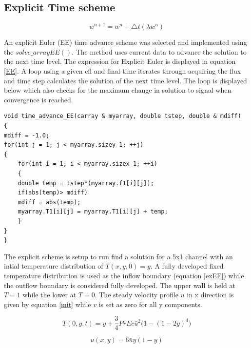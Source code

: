 \documentclass[paper=a4, fontsize=11pt, abstract=on]{scrartcl}
\numberwithin{equation}{section}		%
\numberwithin{figure}{section}			%
\numberwithin{table}{section}				%
\begin{document}
\subsection{Explicit Time scheme}



 \begin{equation}
\label{EE}
w^{n+1}=w^n+\triangle t(\lambda w^n)
\end{equation} 

An explicit Euler (EE) time advance scheme was selected and implemented using the $solve\_ arrayEE()$. The method uses current data to advance the solution to the next time level. The expression for Explicit Euler is displayed in equation \ref{EE}. A loop using a given cfl and final time iterates through acquiring the flux and time step calculates the solution of the next time level. The loop is displayed below which also checks for the maximum change in solution to signal when convergence is reached.



\begin{lstlisting}
void time_advance_EE(carray & myarray, double tstep, double & mdiff)
{
mdiff = -1.0;
for(int j = 1; j < myarray.sizey-1; ++j)
{
    for(int i = 1; i < myarray.sizex-1; ++i)
    {  
    double temp = tstep*(myarray.f1[i][j]); 
    if(abs(temp)> mdiff)
    mdiff = abs(temp);      
    myarray.T1[i][j] = myarray.T1[i][j] + temp;
    }
}
}
\end{lstlisting}


The explicit scheme is setup to run find a solution for a 5x1 channel with an intial temperature distribution of $T(x,y,0) = y$. A fully developed fixed temperature distribution is used as the inflow boundary (equation \ref{exEE}) while the outflow boundary is considered fully developed.  The upper wall is held at $T=1$ while the lower at $T=0$. The steady velocity profile $u$ in x direction is given by equation \ref{init} while $v$ is set as zero for all y components.

 
  \begin{equation}
\label{exEE}
T(0,y,t)=y+\frac{3}{4} Pr Ec \bar{u}^2 \bigg(1-(1-2y)^4\bigg)
\end{equation} 
 
 \begin{equation}
\label{init}
u(x,y) = 6\bar{u} y(1-y)
\end{equation} 
\end{document}
